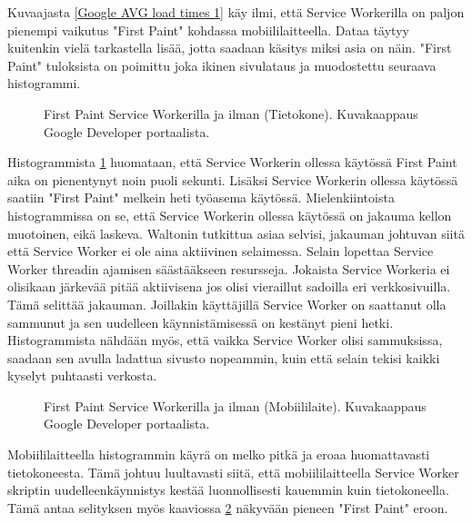 \documentclass{tktltiki}
\begin{document}
Kuvaajasta \ref{Google AVG load times 1} käy ilmi, että Service Workerilla on paljon pienempi vaikutus "First Paint" kohdassa mobiililaitteella. Dataa täytyy kuitenkin vielä tarkastella lisää, jotta saadaan käsitys miksi asia on näin. "First Paint" tuloksista on poimittu joka ikinen sivulataus ja muodostettu seuraava histogrammi.

\begin{figure}[h]
\begin{center}
\caption{First Paint Service Workerilla ja ilman (Tietokone). Kuvakaappaus Google Developer portaalista.}
\label{Google AVG load times 2}
\end{center}
\end{figure}

Histogrammista \ref{Google AVG load times 2} huomataan, että Service Workerin ollessa käytössä First Paint aika on pienentynyt noin puoli sekunti. Lisäksi Service Workerin ollessa käytössä saatiin "First Paint" melkein heti työasema käytössä. Mielenkiintoista histogrammissa on se, että Service Workerin ollessa käytössä on jakauma kellon muotoinen, eikä laskeva. Waltonin tutkittua asiaa selvisi, jakauman johtuvan siitä että Service Worker ei ole aina aktiivinen selaimessa. Selain lopettaa Service Worker threadin ajamisen säästääkseen resursseja. Jokaista Service Workeria ei olisikaan järkevää pitää aktiivisena jos olisi vieraillut sadoilla eri verkkosivuilla. Tämä selittää jakauman. Joillakin käyttäjillä Service Worker on saattanut olla sammunut ja sen uudelleen käynnistämisessä on kestänyt pieni hetki. Histogrammista nähdään myös, että vaikka Service Worker olisi sammuksissa, saadaan sen avulla ladattua sivusto nopeammin, kuin että selain tekisi kaikki kyselyt puhtaasti verkosta. 

\clearpage

\begin{figure}[h]
\begin{center}
\caption{First Paint Service Workerilla ja ilman (Mobiililaite). Kuvakaappaus Google Developer portaalista.}
\label{Google AVG load times 3}
\end{center}
\end{figure}

Mobiililaitteella histogrammin käyrä on melko pitkä ja eroaa huomattavasti tietokoneesta. Tämä johtuu luultavasti siitä, että mobiililaitteella Service Worker skriptin uudelleenkäynnistys kestää luonnollisesti kauemmin kuin tietokoneella. Tämä antaa selityksen myös kaaviossa \ref{Google AVG load times 3} näkyvään pieneen "First Paint" eroon. 
\end{document}
